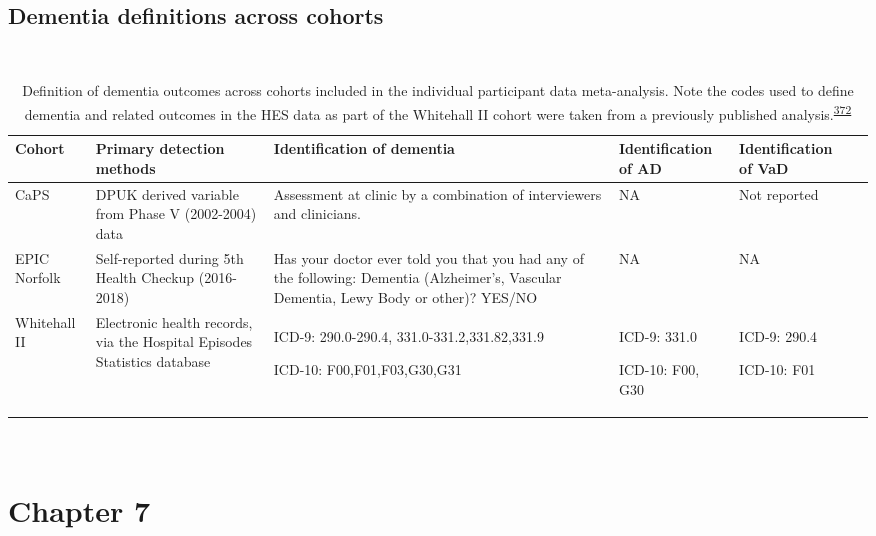 \documentclass[a4paper, twoside]{templates/ociamthesis}
\begin{document}
~

\hypertarget{appendix-ipd-dementia-def}{%
\subsection{Dementia definitions across cohorts}\label{appendix-ipd-dementia-def}}

~





\begin{table}[H]

\caption[Definition of dementia outcomes in IPD meta-analysis]{\label{tab:ipdDementiaDef-table}Definition of dementia outcomes across cohorts included in the individual participant data meta-analysis. Note the codes used to define dementia and related outcomes in the HES data as part of the Whitehall II cohort were taken from a previously published analysis.\textsuperscript{\protect\hyperlink{ref-russ2014}{372}}}
\centering
\begin{tabular}[t]{>{\raggedright\arraybackslash}p{4em}>{\raggedright\arraybackslash}p{6.9em}>{\raggedright\arraybackslash}p{6.9em}>{\raggedright\arraybackslash}p{6.9em}>{\raggedright\arraybackslash}p{6.9em}>{}p{6.9em}}
\toprule
\textbf{Cohort} & \textbf{Primary detection methods} & \textbf{Identification of dementia} & \textbf{Identification of AD} & \textbf{Identification of VaD}\\
\midrule
CaPS & DPUK derived variable from Phase V (2002-2004) data & Assessment at clinic by a combination of interviewers and clinicians. & NA & Not reported\\
\midrule
EPIC Norfolk & Self-reported during 5th Health Checkup (2016-2018) & Has your doctor ever told you that you had any of the following: Dementia (Alzheimer's, Vascular Dementia, Lewy Body or other)? YES/NO & NA & NA\\
\midrule
Whitehall II & Electronic health records, via the Hospital Episodes Statistics database & ICD-9: 290.0-290.4, 331.0-331.2,331.82,331.9

ICD-10: F00,F01,F03,G30,G31 & ICD-9: 331.0

ICD-10: F00, G30 & ICD-9: 290.4

ICD-10: F01\\
\bottomrule
\end{tabular}
\end{table}

~

\hypertarget{appendix-tri-analysis}{%
\section{Chapter 7}\label{appendix-tri-analysis}}
\end{document}
